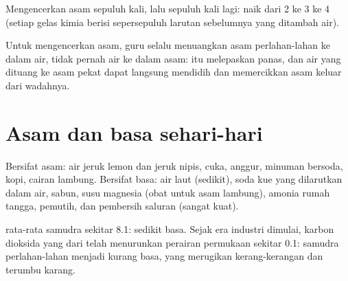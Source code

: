\begin{omfigure}

{\small Mengencerkan asam sepuluh kali, lalu sepuluh kali lagi: 
naik dari 2 ke 3 ke 4 (setiap gelas kimia berisi sepersepuluh larutan
sebelumnya yang ditambah air).}
\end{omfigure}

\begin{inthelab}
Untuk mengencerkan asam, guru selalu menuangkan asam perlahan-lahan ke
dalam air, tidak pernah air ke dalam asam:  itu melepaskan
panas, dan air yang dituang ke asam pekat dapat langsung mendidih dan
memercikkan asam keluar dari wadahnya.
\end{inthelab}

\section{Asam dan basa sehari-hari}

\begin{proposition}\label{prop:g9:acids-bases-ph:everyday}
Bersifat asam: air jeruk lemon dan jeruk nipis, cuka, anggur, minuman
bersoda, kopi, cairan lambung. Bersifat basa: air laut (sedikit), soda
kue yang dilarutkan dalam air, sabun, susu magnesia (obat untuk asam
lambung), amonia rumah tangga, pemutih, dan pembersih saluran
(sangat kuat).
\end{proposition}

\begin{example}[pH samudra]\label{ex:g9:acids-bases-ph:ocean}
 rata-rata samudra sekitar 8.1: sedikit basa. Sejak era industri
dimulai, karbon dioksida yang  dari  telah menurunkan 
perairan permukaan sekitar 0.1: samudra perlahan-lahan menjadi kurang
basa, yang merugikan kerang-kerangan dan terumbu karang.
\end{example}

